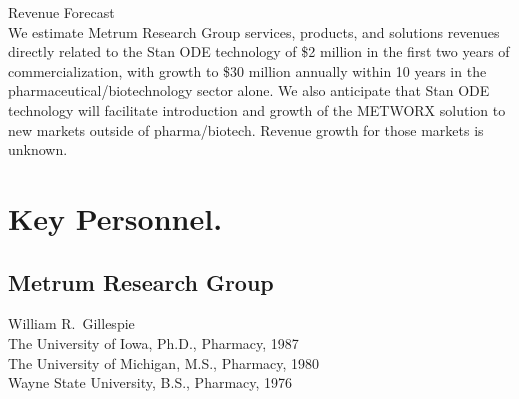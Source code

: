 \documentclass[11pt]{nih2016}
\begin{document}
\noindent
{\sc Revenue Forecast}
\\[2pt]
We estimate Metrum Research Group services, products, and solutions
revenues directly related to the Stan ODE technology of \$2 million in
the first two years of commercialization, with growth to \$30 million
annually within 10 years in the pharmaceutical/biotechnology sector
alone. We also anticipate that Stan ODE technology will facilitate
introduction and growth of the METWORX solution to new markets outside
of pharma/biotech. Revenue growth for those markets is unknown. 


\section{Key Personnel.\label{personnel}}







\subsection{Metrum Research Group}

\noindent
{\sc William R.\ Gillespie}
\\[2pt]
The University of Iowa, Ph.D., Pharmacy, 1987 \\
The University of Michigan, M.S., Pharmacy, 1980 \\
Wayne State University, B.S., Pharmacy, 1976
\\
\end{document}
